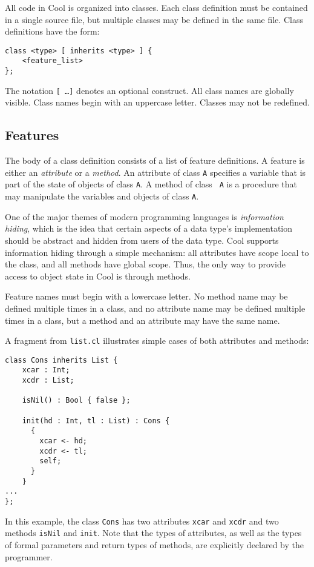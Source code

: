 \documentclass[11pt]{article}
\begin{document}
All code in Cool is organized into classes.  Each class definition must be
contained in a single source file, but multiple classes may be defined in the
same file.  Class definitions have the form:

\begin{verbatim}
class <type> [ inherits <type> ] {
    <feature_list>
};
\end{verbatim}

The notation {\tt [ \ldots ]} denotes an optional construct.
All class names are globally visible.  Class names begin with an
uppercase letter.  Classes may not be redefined.

\subsection{Features}

The body of a class definition consists of a list of feature
definitions.  A feature is either an {\em attribute} or a {\em
method}.  An attribute of class {\tt A} specifies a variable that is
part of the state of objects of class {\tt A}.  A method of class {\tt
A} is a procedure that may manipulate the variables and objects of class {\tt A}.

One of the major themes of modern programming languages is {\em
information hiding}, which is the idea that certain aspects of a data
type's implementation should be abstract and hidden from users of the
data type.  Cool supports information hiding through a simple
mechanism: all attributes have scope local to the class, and all
methods have global scope.  Thus, the only way to provide access to
object state in Cool is through methods.

Feature names must begin with a lowercase letter.  No method name
may be defined multiple times in a class, and no attribute name
may be defined multiple times in a class, but a method and an attribute
may have the same name.

A fragment from {\tt list.cl} illustrates simple cases of both attributes
and methods:

\begin{verbatim}
class Cons inherits List {
	xcar : Int;
	xcdr : List;

	isNil() : Bool { false };

	init(hd : Int, tl : List) : Cons {
	  {
	    xcar <- hd;
	    xcdr <- tl;
	    self;
	  }
	}
...
};
\end{verbatim}
In this example, the class {\tt Cons} has two attributes {\tt xcar} and
{\tt xcdr} and two methods {\tt isNil} and {\tt init}.  Note that the types
of attributes, as well as the types of formal parameters and return types
of methods, are explicitly declared by the programmer.  
\end{document}
